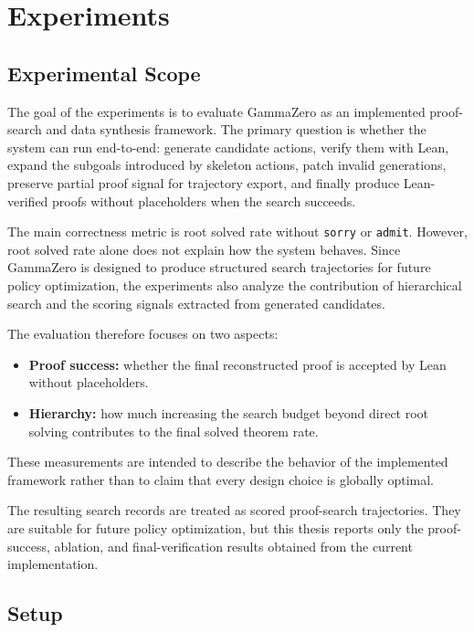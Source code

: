\chapter{Experiments}
\label{sec:experiments}

\section{Experimental Scope}

The goal of the experiments is to evaluate GammaZero as an implemented proof-search and data synthesis framework. The primary question is whether the system can run end-to-end: generate candidate actions, verify them with Lean, expand the subgoals introduced by skeleton actions, patch invalid generations, preserve partial proof signal for trajectory export, and finally produce Lean-verified proofs without placeholders when the search succeeds.

The main correctness metric is root solved rate without \texttt{sorry} or \texttt{admit}. However, root solved rate alone does not explain how the system behaves. Since GammaZero is designed to produce structured search trajectories for future policy optimization, the experiments also analyze the contribution of hierarchical search and the scoring signals extracted from generated candidates.

The evaluation therefore focuses on two aspects:
\begin{itemize}
    \item \textbf{Proof success:} whether the final reconstructed proof is accepted by Lean without placeholders.
    \item \textbf{Hierarchy:} how much increasing the search budget beyond direct root solving contributes to the final solved theorem rate.
\end{itemize}

These measurements are intended to describe the behavior of the implemented framework rather than to claim that every design choice is globally optimal.

The resulting search records are treated as scored proof-search trajectories. They are suitable for future policy optimization, but this thesis reports only the proof-success, ablation, and final-verification results obtained from the current implementation.

\section{Setup}

